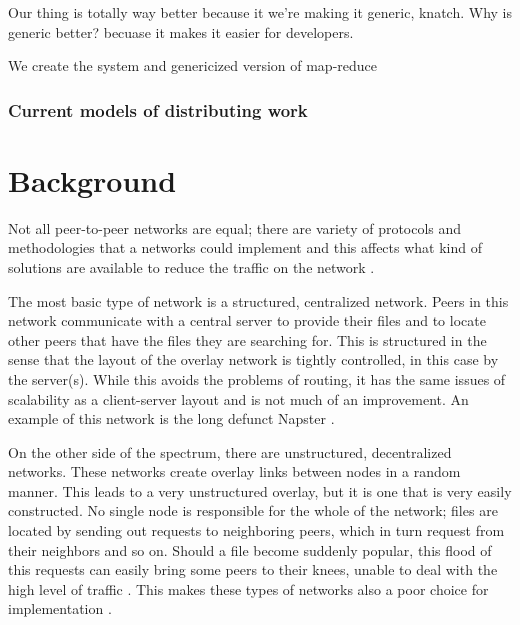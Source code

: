 \documentclass[conference, compsocconf, letterpaper]{IEEEtran}
\begin{document}
Our thing is totally way better because it we're making it generic, knatch.  Why is generic better?  becuase it makes it easier for developers.   

We create the system and genericized version of map-reduce 

\subsubsection{Current models of distributing work}




\section{Background}
Not all peer-to-peer networks are equal; there are variety of protocols and methodologies that a networks could implement and this affects what kind of solutions are available to reduce the traffic on the network    \cite{SurveyCompare} \cite{Overview}.

The most basic type of network is a structured, centralized  network.  Peers in this network communicate with a central server to provide their files and to locate other peers that have the files they are searching for.  This is structured in the sense that the layout of the overlay network is tightly controlled, in this case by the server(s). While this avoids the problems of routing, it has the same issues of scalability as a client-server layout and is not much of an improvement. An example of this network is the long defunct Napster  \cite{SurveyCompare} \cite{Overview}.

On the other side of the spectrum, there are unstructured, decentralized networks.  These networks create overlay links between nodes in a random manner. This leads to a very unstructured overlay, but it is one that is very easily constructed.  No single node is responsible for the whole of the network;  files are located by sending out requests to neighboring peers, which in turn request from their neighbors and so on. Should a file become suddenly popular, this flood of this requests can easily bring some peers to their knees, unable to deal with the high level of traffic \cite{Lv:2002:SRU:514191.514206}.  This makes these types of networks also a poor choice for implementation \cite{Overview}.
\end{document}
